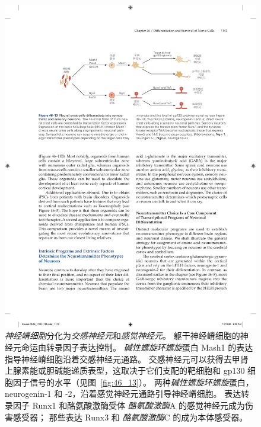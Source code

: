 \begin{figure}[htbp]
	\centering
	\includegraphics[width=0.95\linewidth]{chap46/fig_46_10}
	\caption{\textit{神经嵴细胞}分化为\textit{交感神经元}和\textit{感觉神经元}。
		躯干神经嵴细胞的神经元命运由转录因子表达控制。
		\textit{碱性螺旋环螺旋}蛋白 Mash1 的表达指导神经嵴细胞沿着交感神经元通路。
		交感神经元可以获得去甲肾上腺素能或胆碱能递质表型，这取决于它们支配的靶细胞和 gp130 细胞因子信号的水平（见图~\ref{fig:46_13}）。
		两种\textit{碱性螺旋环螺旋}蛋白，neurogenin-1 和 -2，沿着感觉神经元通路引导神经嵴细胞。
		表达转录因子 Runx1 和酪氨酸激酶受体 \textit{酪氨酸激酶}A 的感觉神经元成为伤害感受器；
		那些表达 Runx3 和 \textit{酪氨酸激酶}C 的成为本体感受器。}
	\label{fig:46_10}
\end{figure}


